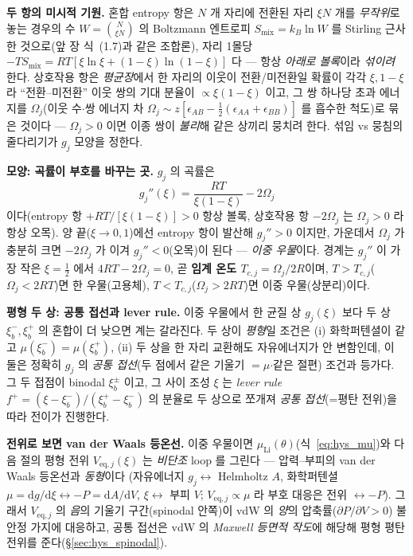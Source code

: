 \documentclass[11pt,a4paper]{article}
\newcommand{\dd}{\mathrm{d}}
\newcommand{\eq}{\mathrm{eq}}
\begin{document}
\textbf{두 항의 미시적 기원.} 혼합 entropy 항은 $N$ 개 자리에 전환된 자리 $\xi N$ 개를 \emph{무작위}로 놓는 경우의
수 $W=\binom{N}{\xi N}$ 의 Boltzmann 엔트로피 $S_\mathrm{mix}=k_B\ln W$ 를 Stirling 근사한 것으로(앞 장 식~(1.7)과
같은 조합론), 자리 1몰당 $-T S_\mathrm{mix}=RT[\xi\ln\xi+(1-\xi)\ln(1-\xi)]$ 다 — 항상 \emph{아래로 볼록}이라
\emph{섞이려} 한다. 상호작용 항은 \emph{평균장}에서 한 자리의 이웃이 전환/미전환일 확률이 각각 $\xi,1-\xi$ 라
``전환--미전환'' 이웃 쌍의 기대 분율이 $\propto\xi(1-\xi)$ 이고, 그 쌍 하나당 초과 에너지를 $\Omega_j$(이웃
수$\cdot$쌍 에너지 차 $\Omega_j\!\sim\!z[\epsilon_{AB}-\tfrac12(\epsilon_{AA}+\epsilon_{BB})]$ 를 흡수한 척도)로
묶은 것이다 — $\Omega_j>0$ 이면 이종 쌍이 \emph{불리}해 같은 상끼리 뭉치려 한다. 섞임 vs 뭉침의 줄다리기가 $g_j$
모양을 정한다.

\textbf{모양: 곡률이 부호를 바꾸는 곳.} $g_j$ 의 곡률은
\begin{equation}
g_j''(\xi)=\frac{RT}{\xi(1-\xi)}-2\Omega_j
\label{eq:hys_gpp}
\end{equation}
이다(entropy 항 $+RT/[\xi(1-\xi)]>0$ 항상 볼록, 상호작용 항 $-2\Omega_j$ 는 $\Omega_j>0$ 라 항상 오목). 양 끝($\xi\to0,1$)에선
entropy 항이 발산해 $g_j''>0$ 이지만, 가운데서 $\Omega_j$ 가 충분히 크면 $-2\Omega_j$ 가 이겨 $g_j''<0$(오목)이
된다 — \emph{이중 우물}이다. 경계는 $g_j''$ 이 가장 작은 $\xi=\tfrac12$ 에서 $4RT-2\Omega_j=0$, 곧 \textbf{임계 온도
$T_{c,j}=\Omega_j/2R$}이며, $T>T_{c,j}$($\Omega_j<2RT$)면 한 우물(고용체), $T<T_{c,j}$($\Omega_j>2RT$)면 이중
우물(상분리)이다.

\textbf{평형 두 상: 공통 접선과 lever rule.} 이중 우물에서 한 균질 상 $g_j(\xi)$ 보다 두 상 $\xi_b^-,\xi_b^+$ 의
혼합이 더 낮으면 계는 갈라진다. 두 상이 \emph{평형}일 조건은 (i) 화학퍼텐셜이 같고 $\mu(\xi_b^-)=\mu(\xi_b^+)$,
(ii) 두 상을 한 자리 교환해도 자유에너지가 안 변함인데, 이 둘은 정확히 $g_j$ 의 \emph{공통 접선}(두 점에서 같은
기울기 $=\mu$$\cdot$같은 절편) 조건과 등가다. 그 두 접점이 binodal $\xi_b^\pm$ 이고, 그 사이 조성 $\xi$ 는
\emph{lever rule} $f^+=(\xi-\xi_b^-)/(\xi_b^+-\xi_b^-)$ 의 분율로 두 상으로 쪼개져 \emph{공통 접선}(=평탄 전위)을
따라 전이가 진행한다.

\textbf{전위로 보면 van der Waals 등온선.} 이중 우물이면 $\mu_\mathrm{Li}(\theta)$(식~\eqref{eq:hys_mu})와 다음 절의
평형 전위 $V_{\eq,j}(\xi)$ 는 \emph{비단조} loop 를 그린다 — 압력--부피의 van der Waals 등온선과 \emph{동형}이다
(자유에너지 $g_j\leftrightarrow$ Helmholtz $A$, 화학퍼텐셜 $\mu=\dd g/\dd\xi\leftrightarrow-P=\dd A/\dd V$, $\xi\leftrightarrow$
부피 $V$; $V_{\eq,j}\propto\mu$ 라 부호 대응은 전위 $\leftrightarrow-P$). 그래서 $V_{\eq,j}$ 의 \emph{음}의 기울기
구간(spinodal 안쪽)이 vdW 의 \emph{양}의 압축률($\partial P/\partial V>0$) 불안정 가지에 대응하고, 공통 접선은
vdW 의 \emph{Maxwell 등면적 작도}에 해당해 평형 평탄 전위를 준다(\S\ref{sec:hys_spinodal}).
\end{document}

